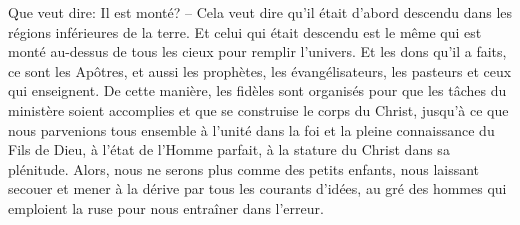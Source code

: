 Que veut dire: Il est monté?
	– Cela veut dire qu’il était d’abord descendu
		dans les régions inférieures de la terre.
Et celui qui était descendu
	est le même qui est monté au-dessus de tous les cieux
		pour remplir l’univers.
Et les dons qu’il a faits, ce sont les Apôtres,
	et aussi les prophètes, les évangélisateurs,
	les pasteurs et ceux qui enseignent.
De cette manière, les fidèles sont organisés
	pour que les tâches du ministère soient accomplies
	et que se construise le corps du Christ,
	jusqu’à ce que nous parvenions tous ensemble à l’unité dans la foi
	et la pleine connaissance du Fils de Dieu,
	à l’état de l’Homme parfait,
	à la stature du Christ dans sa plénitude.
Alors, nous ne serons plus comme des petits enfants,
	nous laissant secouer et mener à la dérive par tous les courants d’idées,
	au gré des hommes qui emploient la ruse pour nous entraîner dans l’erreur.

